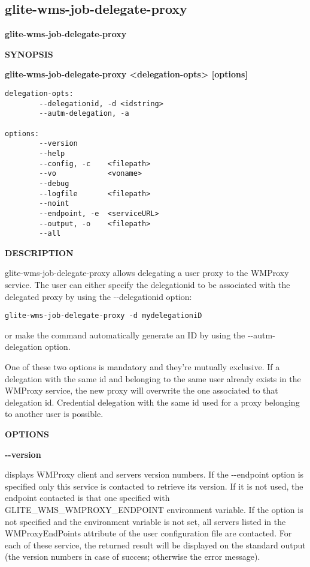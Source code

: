 
\subsection{glite-wms-job-delegate-proxy}
\label{glite-wms-job-delegate-proxy}

\medskip
\textbf{glite-wms-job-delegate-proxy}
\smallskip


\textbf{SYNOPSIS}
\smallskip

\textbf{glite-wms-job-delegate-proxy <delegation-opts> [options]}

\begin{verbatim}
delegation-opts:
        --delegationid, -d <idstring>
        --autm-delegation, -a

options:
        --version
        --help
        --config, -c    <filepath>
        --vo            <voname>
        --debug
        --logfile       <filepath>
        --noint
        --endpoint, -e  <serviceURL>
        --output, -o    <filepath>
        --all
\end{verbatim}

\medskip
\textbf{DESCRIPTION}
\smallskip

glite-wms-job-delegate-proxy allows delegating a user proxy to the WMProxy service. 
The user can either specify the delegationid to be associated with the delegated proxy by
using the -{}-delegationid option:
\begin{verbatim}
glite-wms-job-delegate-proxy -d mydelegationiD
\end{verbatim}
or make the command automatically generate an ID by using the -{}-autm-delegation option.

One of these two options is mandatory and they're mutually exclusive.
If a delegation with the same id and belonging to the same user already exists in the WMProxy service, 
the new proxy will overwrite the one associated to that delegation id.
Credential delegation with the same id used for a proxy belonging to another user is possible.


\medskip\textbf{OPTIONS}\smallskip



\textbf{-{}-version}

displays WMProxy client and servers version numbers.
If the -{}-endpoint option is specified only this service is contacted to retrieve its version. If it is not used, the endpoint contacted is that one specified with GLITE\_WMS\_WMPROXY\_ENDPOINT environment variable. If the option is not specified and the environment variable is not set, all servers listed in the WMProxyEndPoints attribute of the user configuration file are contacted. For each of these service, the returned result will be displayed on the standard output (the version numbers in case of success; otherwise the error message).




